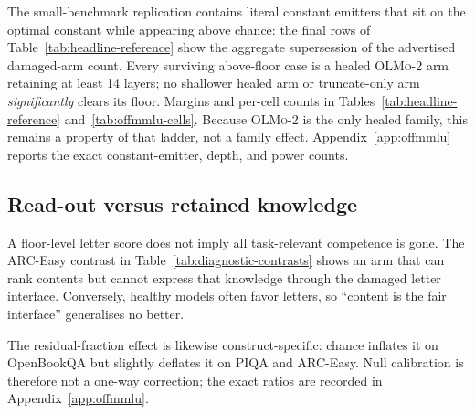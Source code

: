 The small-benchmark replication contains literal constant emitters that sit on the optimal constant while appearing above chance: the final rows of Table~\ref{tab:headline-reference} show the aggregate supersession of the advertised damaged-arm count. Every surviving above-floor case is a healed \textsc{OLMo-2} arm retaining at least 14 layers; no shallower healed arm or truncate-only arm \emph{significantly} clears its floor. Margins and per-cell counts in Tables~\ref{tab:headline-reference} and~\ref{tab:offmmlu-cells}. Because \textsc{OLMo-2} is the only healed family, this remains a property of that ladder, not a family effect. Appendix~\ref{app:offmmlu} reports the exact constant-emitter, depth, and power counts.

\subsection{Read-out versus retained knowledge}

A floor-level letter score does not imply all task-relevant competence is gone. The ARC-Easy contrast in Table~\ref{tab:diagnostic-contrasts} shows an arm that can rank contents but cannot express that knowledge through the damaged letter interface. Conversely, healthy models often favor letters, so ``content is the fair interface'' generalises no better.

The residual-fraction effect is likewise construct-specific: chance inflates it on OpenBookQA but slightly deflates it on PIQA and ARC-Easy. Null calibration is therefore not a one-way correction; the exact ratios are recorded in Appendix~\ref{app:offmmlu}.

